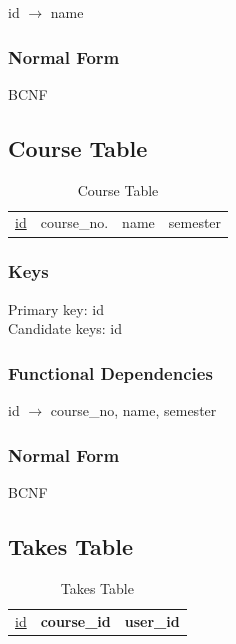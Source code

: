\documentclass[11pt]{article}
\begin{document}
    id $\rightarrow$ name\\
\subsubsection{Normal Form}
\label{sec-3-4-3}

    
    BCNF
\subsection{Course Table}
\label{sec-3-5}

   
\begin{table}[htb]
\caption{Course Table} 
\begin{center}
\begin{tabular}{l|l|l|l}
 \underline{id}  &  course\_no.  &  name  &  semester  \\
\end{tabular}
\end{center}
\end{table}
\subsubsection{Keys}
\label{sec-3-5-1}

    
    Primary key: id\\
    Candidate keys: id
\subsubsection{Functional Dependencies}
\label{sec-3-5-2}


    id $\rightarrow$ course\_no, name, semester
\subsubsection{Normal Form}
\label{sec-3-5-3}


    BCNF
\subsection{Takes Table}
\label{sec-3-6}


\begin{table}[htb]
\caption{Takes Table} 
\begin{center}
\begin{tabular}{l|l|l}
 \underline{id}  &  \textbf{course\_id}  &  \textbf{user\_id}  \\
\end{tabular}
\end{center}
\end{table}
\end{document}
